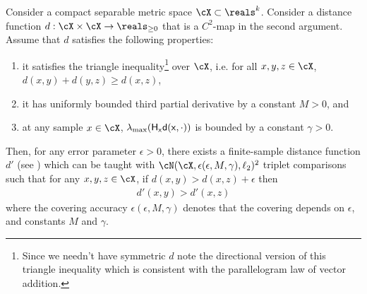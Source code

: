 \begin{theorem}\label{thm: smoothl2} Consider a compact separable metric space $\cX \subset \reals^k$. Consider a distance function $d: \cX \times \cX \to \reals_{\ge 0}$ that is a $C^2$-map in the second argument. Assume that $d$ satisfies the following properties:
\begin{enumerate}
    \item it satisfies the triangle inequality\footnote{Since we needn't have symmetric $d$ note the directional version of this triangle inequality which is consistent with the parallelogram law of vector addition.} over $\cX$, i.e. for all $x,y,z \in \cX$, $d(x,y) + d(y,z) \ge d(x,z)$,
    \item it has uniformly bounded third partial derivative by a constant $M > 0$, and
    \item at any sample $x \in \cX$, $\lambda_{\max}(\sf{H}_x d(x,\cdot))$ is bounded by a constant $\gamma > 0$. 
\end{enumerate}

Then, for any error parameter $\epsilon > 0$, there exists a finite-sample distance function $d'$ (see ) which can be taught with $\cN(\cX, \epsilon(\epsilon, M, \gamma), \ell_2)^2$ triplet comparisons such that for any $x,y,z \in \cX$, if $d(x,y) > d(x,z) + \epsilon$ then
\begin{align*}
    d'(x,y) > d'(x,z)
\end{align*}
where the covering accuracy $\epsilon(\epsilon, M, \gamma)$ denotes that the covering depends on $\epsilon$, and constants $M$ and $\gamma$.


    
\end{theorem}
